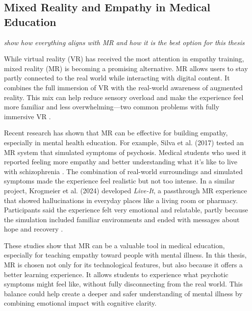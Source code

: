 \subsection{Mixed Reality and Empathy in Medical Education}
\emph{show how everything aligns with MR and how it is the best option for this thesis}

While virtual reality (VR) has received the most attention in empathy training, mixed reality (MR) is becoming a promising alternative. MR allows users to stay partly connected to the real world while interacting with digital content. It combines the full immersion of VR with the real-world awareness of augmented reality. This mix can help reduce sensory overload and make the experience feel more familiar and less overwhelming—two common problems with fully immersive VR \cite{Zare-Bidaki2022}.

Recent research has shown that MR can be effective for building empathy, especially in mental health education. For example, Silva et al. (2017) tested an MR system that simulated symptoms of psychosis. Medical students who used it reported feeling more empathy and better understanding what it’s like to live with schizophrenia \cite{Silva2017}. The combination of real-world surroundings and simulated symptoms made the experience feel realistic but not too intense. In a similar project, Krogmeier et al. (2024) developed \textit{Live-It}, a passthrough MR experience that showed hallucinations in everyday places like a living room or pharmacy. Participants said the experience felt very emotional and relatable, partly because the simulation included familiar environments and ended with messages about hope and recovery \cite{Krogmeier2024}.

These studies show that MR can be a valuable tool in medical education, especially for teaching empathy toward people with mental illness. In this thesis, MR is chosen not only for its technological features, but also because it offers a better learning experience. It allows students to experience what psychotic symptoms might feel like, without fully disconnecting from the real world. This balance could help create a deeper and safer understanding of mental illness by combining emotional impact with cognitive clarity.


